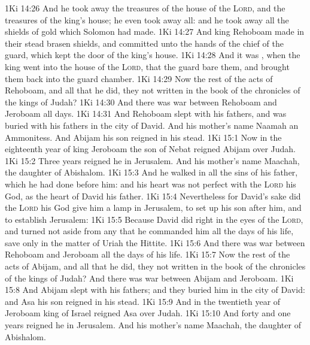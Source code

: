 \vs 1Ki 14:26 And he took away the treasures of the house of the \textsc{Lord}, and the treasures of the king's house; he even took away all: and he took away all the shields of gold which Solomon had made.
\vs 1Ki 14:27 And king Rehoboam made in their stead brasen shields, and committed  unto the hands of the chief of the guard, which kept the door of the king's house.
\vs 1Ki 14:28 And it was , when the king went into the house of the \textsc{Lord}, that the guard bare them, and brought them back into the guard chamber.
\vs 1Ki 14:29 Now the rest of the acts of Rehoboam, and all that he did,  they not written in the book of the chronicles of the kings of Judah?
\vs 1Ki 14:30 And there was war between Rehoboam and Jeroboam all  days.
\vs 1Ki 14:31 And Rehoboam slept with his fathers, and was buried with his fathers in the city of David. And his mother's name  Naamah an Ammonitess. And Abijam his son reigned in his stead.
\vs 1Ki 15:1 Now in the eighteenth year of king Jeroboam the son of Nebat reig\-ned Abijam over Judah.
\vs 1Ki 15:2 Three years reigned he in Jerusalem. And his mother's name  Maachah, the daughter of Abishalom.
\vs 1Ki 15:3 And he walked in all the sins of his father, which he had done before him: and his heart was not perfect with the \textsc{Lord} his God, as the heart of David his father.
\vs 1Ki 15:4 Nevertheless for David's sake did the \textsc{Lord} his God give him a lamp in Jerusalem, to set up his son after him, and to establish Jerusalem:
\vs 1Ki 15:5 Because David did  right in the eyes of the \textsc{Lord}, and turned not aside from any  that he commanded him all the days of his life, save only in the matter of Uriah the Hittite.
\vs 1Ki 15:6 And there was war between Rehoboam and Jeroboam all the days of his life.
\vs 1Ki 15:7 Now the rest of the acts of Abijam, and all that he did,  they not written in the book of the chronicles of the kings of Judah? And there was war between Abijam and Jeroboam.
\vs 1Ki 15:8 And Abijam slept with his fathers; and they buried him in the city of David: and Asa his son reigned in his stead.
\vs 1Ki 15:9 And in the twentieth year of Jeroboam king of Israel reigned Asa over Judah.
\vs 1Ki 15:10 And forty and one years reigned he in Jerusalem. And his mother's name  Maachah, the daughter of Abishalom.
